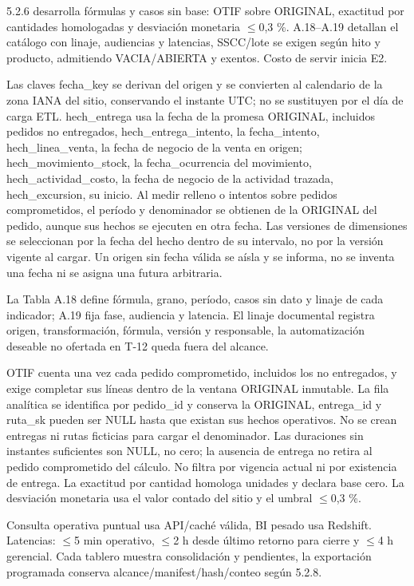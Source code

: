 5.2.6 desarrolla fórmulas y casos sin base: OTIF sobre ORIGINAL, exactitud por cantidades homologadas y desviación monetaria \ensuremath{\leq}0,3 \%. A.18–A.19 detallan el catálogo con linaje, audiencias y latencias, SSCC/lote se exigen según hito y producto, admitiendo VACIA/ABIERTA y exentos. Costo de servir inicia E2.

Las claves fecha\_key se derivan del origen y se convierten al calendario de la zona IANA del sitio, conservando el instante UTC; no se sustituyen por el día de carga ETL. hech\_entrega usa la fecha de la promesa ORIGINAL, incluidos pedidos no entregados, hech\_entrega\_intento, la fecha\_intento, hech\_linea\_venta, la fecha de negocio de la venta en origen; hech\_movimiento\_stock, la fecha\_ocurrencia del movimiento, hech\_actividad\_costo, la fecha de negocio de la actividad trazada, hech\_excursion, su inicio. Al medir relleno o intentos sobre pedidos comprometidos, el período y denominador se obtienen de la ORIGINAL del pedido, aunque sus hechos se ejecuten en otra fecha. Las versiones de dimensiones se seleccionan por la fecha del hecho dentro de su intervalo, no por la versión vigente al cargar. Un origen sin fecha válida se aísla y se informa, no se inventa una fecha ni se asigna una futura arbitraria.

La Tabla A.18 define fórmula, grano, período, casos sin dato y linaje de cada indicador; A.19 fija fase, audiencia y latencia. El linaje documental registra origen, transformación, fórmula, versión y responsable, la automatización deseable no ofertada en T-12 queda fuera del alcance.


OTIF cuenta una vez cada pedido comprometido, incluidos los no entregados, y exige completar sus líneas dentro de la ventana ORIGINAL inmutable. La fila analítica se identifica por pedido\_id y conserva la ORIGINAL, entrega\_id y ruta\_sk pueden ser NULL hasta que existan sus hechos operativos. No se crean entregas ni rutas ficticias para cargar el denominador. Las duraciones sin instantes suficientes son NULL, no cero; la ausencia de entrega no retira al pedido comprometido del cálculo. No filtra por vigencia actual ni por existencia de entrega. La exactitud por cantidad homologa unidades y declara base cero. La desviación monetaria usa el valor contado del sitio y el umbral \ensuremath{\leq}0,3 \%.


Consulta operativa puntual usa API/caché válida, BI pesado usa Redshift. Latencias: \ensuremath{\leq}5 min operativo, \ensuremath{\leq}2 h desde último retorno para cierre y \ensuremath{\leq}4 h gerencial. Cada tablero muestra consolidación y pendientes, la exportación programada conserva alcance/manifest/hash/conteo según 5.2.8.

